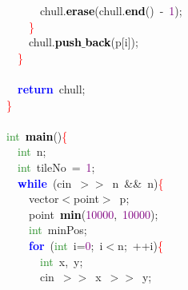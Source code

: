 {{\mbox{}\ \ \ \ \ \ chull\textcolor{BrickRed}{.}\textbf{\textcolor{Black}{erase}}\textcolor{BrickRed}{(}chull\textcolor{BrickRed}{.}\textbf{\textcolor{Black}{end}}\textcolor{BrickRed}{()}\ \textcolor{BrickRed}{-}\ \textcolor{Purple}{1}\textcolor{BrickRed}{);} \\
\mbox{}\ \ \ \ \textcolor{Red}{\}} \\
\mbox{}\ \ \ \ chull\textcolor{BrickRed}{.}\textbf{\textcolor{Black}{push$\_$back}}\textcolor{BrickRed}{(}p\textcolor{BrickRed}{[}i\textcolor{BrickRed}{]);} \\
\mbox{}\ \ \textcolor{Red}{\}} \\
\mbox{} \\
\mbox{}\ \ \textbf{\textcolor{Blue}{return}}\ chull\textcolor{BrickRed}{;} \\
\mbox{}\textcolor{Red}{\}} \\
\mbox{} \\
\mbox{}\textcolor{ForestGreen}{int}\ \textbf{\textcolor{Black}{main}}\textcolor{BrickRed}{()}\textcolor{Red}{\{} \\
\mbox{}\ \ \textcolor{ForestGreen}{int}\ n\textcolor{BrickRed}{;} \\
\mbox{}\ \ \textcolor{ForestGreen}{int}\ tileNo\ \textcolor{BrickRed}{=}\ \textcolor{Purple}{1}\textcolor{BrickRed}{;} \\
\mbox{}\ \ \textbf{\textcolor{Blue}{while}}\ \textcolor{BrickRed}{(}cin\ \textcolor{BrickRed}{$>$$>$}\ n\ \textcolor{BrickRed}{\&\&}\ n\textcolor{BrickRed}{)}\textcolor{Red}{\{} \\
\mbox{}\ \ \ \ vector\textcolor{BrickRed}{$<$}point\textcolor{BrickRed}{$>$}\ p\textcolor{BrickRed}{;} \\
\mbox{}\ \ \ \ point\ \textbf{\textcolor{Black}{min}}\textcolor{BrickRed}{(}\textcolor{Purple}{10000}\textcolor{BrickRed}{,}\ \textcolor{Purple}{10000}\textcolor{BrickRed}{);} \\
\mbox{}\ \ \ \ \textcolor{ForestGreen}{int}\ minPos\textcolor{BrickRed}{;} \\
\mbox{}\ \ \ \ \textbf{\textcolor{Blue}{for}}\ \textcolor{BrickRed}{(}\textcolor{ForestGreen}{int}\ i\textcolor{BrickRed}{=}\textcolor{Purple}{0}\textcolor{BrickRed}{;}\ i\textcolor{BrickRed}{$<$}n\textcolor{BrickRed}{;}\ \textcolor{BrickRed}{++}i\textcolor{BrickRed}{)}\textcolor{Red}{\{} \\
\mbox{}\ \ \ \ \ \ \textcolor{ForestGreen}{int}\ x\textcolor{BrickRed}{,}\ y\textcolor{BrickRed}{;} \\
\mbox{}\ \ \ \ \ \ cin\ \textcolor{BrickRed}{$>$$>$}\ x\ \textcolor{BrickRed}{$>$$>$}\ y\textcolor{BrickRed}{;} \\
}}
